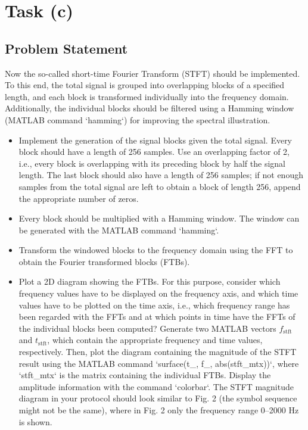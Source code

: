 \item[(c)]
\section*{Task (c)}

\subsection*{Problem Statement}
Now the so-called short-time Fourier Transform (STFT) should be implemented. To this end, the total signal is grouped into overlapping blocks of a specified length, and each block is transformed individually into the frequency domain. Additionally, the individual blocks should be filtered using a Hamming window (MATLAB command `hamming`) for improving the spectral illustration.

\begin{itemize}
    \item Implement the generation of the signal blocks given the total signal. Every block should have a length of 256 samples. Use an overlapping factor of 2, i.e., every block is overlapping with its preceding block by half the signal length. The last block should also have a length of 256 samples; if not enough samples from the total signal are left to obtain a block of length 256, append the appropriate number of zeros.
    \item Every block should be multiplied with a Hamming window. The window can be generated with the MATLAB command `hamming`.
    \item Transform the windowed blocks to the frequency domain using the FFT to obtain the Fourier transformed blocks (FTBs).
    \item Plot a 2D diagram showing the FTBs. For this purpose, consider which frequency values have to be displayed on the frequency axis, and which time values have to be plotted on the time axis, i.e., which frequency range has been regarded with the FFTs and at which points in time have the FFTs of the individual blocks been computed? Generate two MATLAB vectors \( f_{\text{stft}} \) and \( t_{\text{stft}} \), which contain the appropriate frequency and time values, respectively. Then, plot the diagram containing the magnitude of the STFT result using the MATLAB command `surface(t_{}, f_{}, abs(stft_mtx))`, where `stft_mtx` is the matrix containing the individual FTBs. Display the amplitude information with the command `colorbar`. The STFT magnitude diagram in your protocol should look similar to Fig. 2 (the symbol sequence might not be the same), where in Fig. 2 only the frequency range 0–2000 Hz is shown.
\end{itemize}

